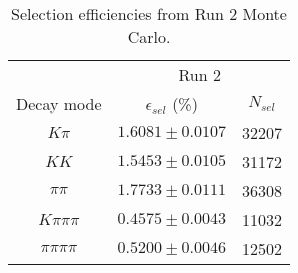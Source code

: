 \documentclass{article}
\begin{document}
\begin{table}[H]
    \centering
    \begin{tabular}{ccc}
        \toprule
        & \multicolumn{2}{c}{Run 2} \\
        Decay mode & $\epsilon_{sel}$ (\%) & $N_{sel}$ \\
        \midrule
        $K\pi$ & $1.6081 \pm 0.0107$ & 32207 \\
        $KK$ & $1.5453 \pm 0.0105$ & 31172 \\
        $\pi\pi$ & $1.7733 \pm 0.0111$ & 36308 \\
        $K\pi\pi\pi$ &  $0.4575 \pm 0.0043$ & 11032 \\
        $\pi\pi\pi\pi$ &  $0.5200 \pm 0.0046$ & 12502 \\
        \bottomrule
    \end{tabular}
    \caption{Selection efficiencies from Run 2 Monte Carlo.}
\label{tab:PID_efficiency}
\end{table}
\end{document}
